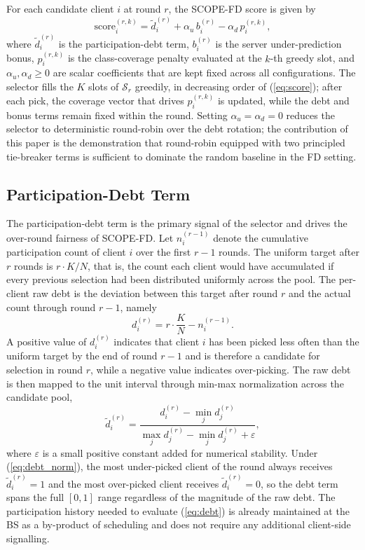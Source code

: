 \documentclass[journal]{IEEEtran}
\begin{document}
For each candidate client $i$ at round $r$, the SCOPE-FD score is given by
\begin{equation}
\text{score}_i^{(r,k)} = \tilde{d}_i^{(r)} + \alpha_u\, b_i^{(r)} - \alpha_d\, p_i^{(r,k)},
\label{eq:score}
\end{equation}
where $\tilde{d}_i^{(r)}$ is the participation-debt term, $b_i^{(r)}$ is the server under-prediction bonus, $p_i^{(r,k)}$ is the class-coverage penalty evaluated at the $k$-th greedy slot, and $\alpha_u, \alpha_d \ge 0$ are scalar coefficients that are kept fixed across all configurations. The selector fills the $K$ slots of $\mathcal{S}_r$ greedily, in decreasing order of (\ref{eq:score}); after each pick, the coverage vector that drives $p_i^{(r,k)}$ is updated, while the debt and bonus terms remain fixed within the round. Setting $\alpha_u = \alpha_d = 0$ reduces the selector to deterministic round-robin over the debt rotation; the contribution of this paper is the demonstration that round-robin equipped with two principled tie-breaker terms is sufficient to dominate the random baseline in the FD setting.

\subsection{Participation-Debt Term}
\label{ssec:debt-term}

The participation-debt term is the primary signal of the selector and drives the over-round fairness of SCOPE-FD. Let $n_i^{(r-1)}$ denote the cumulative participation count of client $i$ over the first $r-1$ rounds. The uniform target after $r$ rounds is $r\cdot K/N$, that is, the count each client would have accumulated if every previous selection had been distributed uniformly across the pool. The per-client raw debt is the deviation between this target after round $r$ and the actual count through round $r-1$, namely
\begin{equation}
d_i^{(r)} = r\cdot \frac{K}{N} - n_i^{(r-1)}.
\label{eq:debt}
\end{equation}
A positive value of $d_i^{(r)}$ indicates that client $i$ has been picked less often than the uniform target by the end of round $r-1$ and is therefore a candidate for selection in round $r$, while a negative value indicates over-picking. The raw debt is then mapped to the unit interval through min-max normalization across the candidate pool,
\begin{equation}
\tilde{d}_i^{(r)} = \frac{d_i^{(r)} - \min_j d_j^{(r)}}{\max_j d_j^{(r)} - \min_j d_j^{(r)} + \varepsilon},
\label{eq:debt_norm}
\end{equation}
where $\varepsilon$ is a small positive constant added for numerical stability. Under (\ref{eq:debt_norm}), the most under-picked client of the round always receives $\tilde{d}_i^{(r)} = 1$ and the most over-picked client receives $\tilde{d}_i^{(r)} = 0$, so the debt term spans the full $[0,1]$ range regardless of the magnitude of the raw debt. The participation history needed to evaluate (\ref{eq:debt}) is already maintained at the BS as a by-product of scheduling and does not require any additional client-side signalling.
\end{document}
